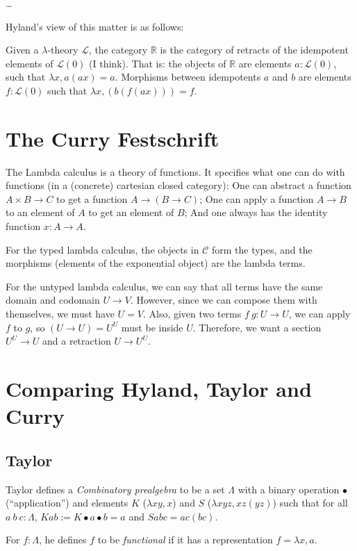 \documentclass{amsbook}
\newcommand{\Catc}[1]{\mathcal{#1}}
\newcommand{\CC}{\Catc{C}}
\theoremstyle{definition}
\begin{document}
  \dots

  Hyland's view of this matter is as follows:

  Given a $ \lambda $-theory $ \mathcal L $, the category $ \mathbb R $ is the category of retracts of the idempotent elements of $ \mathcal L(0) $ (I think). That is: the objects of $ \mathbb R $ are elements $ a: \mathcal L(0) $, such that $ \lambda x, a (a x) = a $. Morphisms between idempotents $ a $ and $ b $ are elements $ f: \mathcal L(0) $ such that $ \lambda x, (b (f (a x))) = f $.

  \section{The Curry Festschrift}
  The Lambda calculus is a theory of functions. It specifies what one can do with functions (in a (concrete) cartesian closed category): One can abstract a function $ A \times B \to C $ to get a function $ A \to (B \to C) $; One can apply a function $ A \to B $ to an element of $ A $ to get an element of $ B $; And one always has the identity function $ x: A \to A $.

  For the typed lambda calculus, the objects in $ \CC $ form the types, and the morphisms (elements of the exponential object) are the lambda terms.

  For the untyped lambda calculus, we can say that all terms have the same domain and codomain $ U \to V $. However, since we can compose them with themselves, we must have $ U = V $. Also, given two terms $ f\ g: U \to U $, we can apply $ f $ to $ g $, so $ (U \to U) = U^U $ must be inside $ U $. Therefore, we want a section $ U^U \to U $ and a retraction $ U \to U^U $.

  \section{Comparing Hyland, Taylor and Curry}
  \subsection{Taylor}
  Taylor defines a \textit{Combinatory prealgebra} to be a set $ \Lambda $ with a binary operation $ \bullet $ (``application'') and elements $ K $ ($ \lambda x y, x $) and $ S $ ($ \lambda x y z, x z (y z) $) such that for all $ a\ b\ c: \Lambda $, $ K a b := K \bullet a \bullet b = a $ and $ S a b c = a c (b c) $.

  For $ f: \Lambda $, he defines $ f $ to be \textit{functional} if it has a representation $ f = \lambda x, a $.
\end{document}
